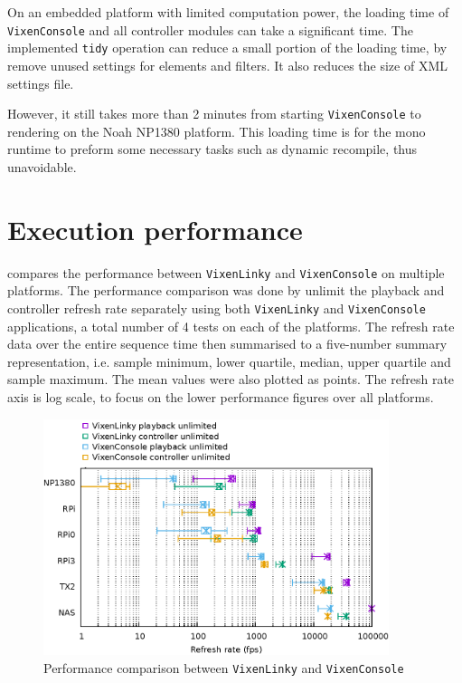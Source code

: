 On an embedded platform with limited computation power, the loading time of \texttt{VixenConsole} and all controller modules can take a significant time. The implemented \texttt{tidy} operation can reduce a small portion of the loading time, by remove unused settings for elements and filters. It also reduces the size of XML settings file.

However, it still takes more than 2 minutes from starting \texttt{VixenConsole} to rendering on the Noah NP1380 platform. This loading time is for the mono runtime to preform some necessary tasks such as dynamic recompile, thus unavoidable.

\section{Execution performance}

 compares the performance between \texttt{VixenLinky} and \texttt{VixenConsole} on multiple platforms. The performance comparison was done by unlimit the playback and controller refresh rate separately using both \texttt{VixenLinky} and \texttt{VixenConsole} applications, a total number of 4 tests on each of the platforms. The refresh rate data over the entire sequence time then summarised to a five-number summary representation, i.e. sample minimum, lower quartile, median, upper quartile and sample maximum. The mean values were also plotted as points. The refresh rate axis is log scale, to focus on the lower performance figures over all platforms.

\begin{figure}[t]
  \centering
  \includegraphics[width=0.9\textwidth]{Figs/raw-seq-p-c.eps}
  \caption{\footnotesize Performance comparison between \texttt{VixenLinky} and \texttt{VixenConsole}}
  \label{fig:raw-seq-p-c}
\end{figure}

